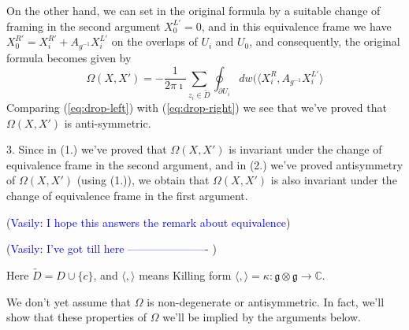 \documentclass[11pt, oneside, reqno]{amsart}
\theoremstyle{definition} \newtheorem{definition}{Definition}[section]
\theoremstyle{definition} \newtheorem{remark}[definition]{Remark}
\theoremstyle{definition} \newtheorem{remarks}[definition]{Remarks}
\theoremstyle{definition} \newtheorem{question}[definition]{Question}
\theoremstyle{definition} \newtheorem*{note}{Note}
\theoremstyle{definition} \newtheorem{example}[definition]{Example}
\theoremstyle{definition} \newtheorem{examples}[definition]{Examples}
\renewcommand{\gg}{\mathfrak{g}}
\newcommand{\vasily}[1]{(\textcolor{blue}{Vasily: #1})}
\begin{document}
On the other hand, we can set in the original formula by a suitable change
of framing in the second argument $X_0^{L'} = 0$, and in this equivalence
frame we have $X_0^{R'} =  X_{i}^{R'}  + A_{g^{-1}} X_{i}^{L'}$ on the
overlaps of $U_i$ and $U_0$, and consequently, the original formula becomes
given by
\begin{equation}
\label{eq:drop-left}
  \Omega(X, X') =   -\frac{1}{2 \pi \imath} \sum_{z_i \in \tilde D} \oint_{\partial U_i}  dw (
\langle  X^{R}_{i},  A_{g^{-1}} X_i^{L'} \rangle 
\end{equation}
Comparing (\ref{eq:drop-left}) with (\ref{eq:drop-right}) we see that we've proved that $\Omega(X,X')$ is anti-symmetric.


3. Since in (1.) we've proved that $\Omega(X,X')$ is invariant under
the change of equivalence frame in the second argument, and in (2.) we've proved
antisymmetry of $\Omega(X, X')$ (using (1.)), we obtain that $\Omega(X, X')$ is also
invariant under the change of equivalence frame in the first argument.

\vasily{I hope this answers the remark about equivalence}

\vasily{I've got till here ----------------------  } 





Here $\tilde D = D \cup \{ c \}$, and $\langle, \rangle$ means Killing form $\langle, \rangle = \kappa: \gg \otimes \gg \to \mathbb{C}$.

We don't yet assume that $\Omega$ is non-degenerate or antisymmetric. In fact, we'll show
that these properties of $\Omega$  we'll be implied by the arguments below. 
\end{document}
